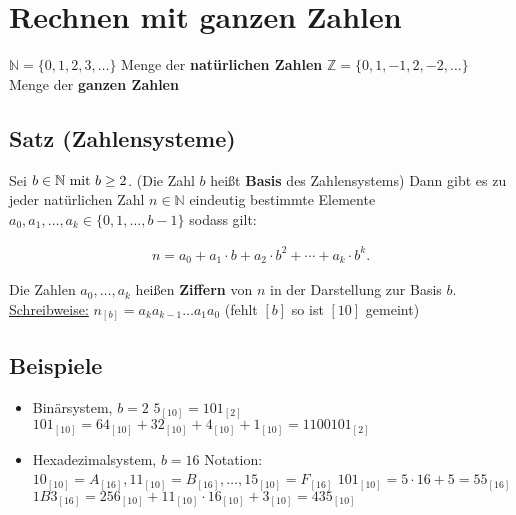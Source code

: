 \section{Rechnen mit ganzen Zahlen}
$\mathbb{N} = \{0, 1, 2, 3,  \dots \}$ Menge der \textbf{natürlichen Zahlen} \newline
$\mathbb{Z} = \{0, 1, -1, 2, -2,  \dots \}$ Menge der \textbf{ganzen Zahlen}


\subsection[Zahlensysteme]{Satz (Zahlensysteme)}

	Sei $b \in \mathbb{N} \textnormal{ mit } b \geq 2 $. 
	(Die Zahl $b$ heißt \textbf{Basis} des Zahlensystems)\newline
	Dann gibt es zu jeder natürlichen Zahl $n \in \mathbb{N}$ eindeutig bestimmte Elemente 
	$a_0, a_1, \dots,a_k \in \{0,1, \dots, b-1 \} $ sodass gilt:

	\begin{align*}
		n = a_0 + a_1 \cdot b + a_2 \cdot b^2 + \cdots + a_k \cdot b^k.
	\end{align*}

	Die Zahlen $a_0,\dots,a_k$ heißen \textbf{Ziffern} von $n$ in der Darstellung zur Basis $b$. \newline
	\underline{Schreibweise:} $n_{[b]} = a_k a_{k-1} \dots a_1 a_0 $ (fehlt $[b]$ so ist $[10]$ gemeint)


\subsection{Beispiele}

	\begin{itemize}
	
		\item Binärsystem, $b=2$ \newline
		$5_{[10]}=101_{[2]}$ \newline
		$101_{[10]}=64_{[10]}+32_{[10]}+4_{[10]}+1_{[10]}=1100101_{[2]}$
		
		\item Hexadezimalsystem, $b=16$ \newline
		Notation: $10_{[10]}=A_{[16]}, 11_{[10]}=B_{[16]},\dots,15_{[10]}=F_{[16]}$ \newline
		$101_{[10]}=5\cdot 16+5=55_{[16]}$ \newline
		$1B3_{[16]}=256_{[10]}+11_{[10]}\cdot 16_{[10]}+3_{[10]}=435_{[10]}$
	
	\end{itemize}
	

